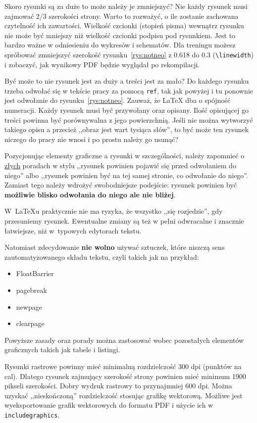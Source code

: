 Skoro rysunki są za duże to może należy je zmniejszyć? Nie każdy rysunek musi zajmować 2/3 szerokości strony. Warto to rozważyć, o ile zostanie zachowana czytelność ich zawartości. Wielkość czcionki (stopień pisma) wewnątrz rysunku nie może być mniejszy niż wielkość czcionki podpisu pod rysunkiem. Jest to bardzo ważne w odniesieniu do wykresów i schematów. Dla treningu możesz spróbować zmniejszyć szerokość rysunku~\ref{rys:notneo} z 0.618 do 0.3 (\texttt{\textbackslash linewidth}) i zobaczyć, jak wynikowy PDF będzie wyglądał po rekompilacji.

Być może to nie rysunek jest za duży a treści jest za mało? Do każdego rysunku trzeba odwołać się w tekście pracy za pomocą \texttt{ref}, tak jak powyżej i tu ponownie jest odwołanie do rysunku~\ref{rys:notneo}. Zauważ, że \LaTeX{} dba o spójność numeracji. Każdy rysunek musi być przywołany oraz opisany. Ilość opisującej go treści powinna być porównywalna z jego powierzchnią. Jeśli nie można wytworzyć takiego opisu a przecież ,,obraz jest wart tysiąca słów'', to być może ten rysunek niczego do pracy nie wnosi i po prostu należy go usunąć?

Pozycjonując elementy graficzne a rysunki w szczególności, należy zapomnieć o \underline{złych} poradach w stylu ,,rysunek powinien pojawić się przed odwołaniem do niego'' albo ,,rysunek powinien być na tej samej stronie, co odwołanie do niego''. Zamiast tego należy wdrożyć swobodniejsze podejście: rysunek powinien być \textbf{możliwie blisko odwołania do niego ale nie bliżej}.

W~\LaTeX{u} praktycznie nie ma ryzyka, że wszystko ,,się rozjedzie'', gdy przesuniemy rysunek. Ewentualne zmiany są też w pełni odwracalne i znacznie łatwiejsze, niż w~typowych edytorach tekstu.

Natomiast zdecydowanie \textbf{nie wolno} używać sztuczek, które niszczą sens zautomatyzowanego składu tekstu, czyli takich jak na przykład:
\begin{itemize}
	\item FloatBarrier
	\item pagebreak
	\item newpage
	\item clearpage
\end{itemize}

Powyższe zasady oraz porady można zastosować wobec pozostałych elementów graficznych takich jak tabele i listingi.

Rysunki rastrowe powinny mieć minimalną rozdzielczość 300 dpi (punktów na cal). Dlatego rysunek zajmujący szerokość strony powinien mieć minimum 1900 pikseli szerokości. Dobry wydruk rastrowy to przynajmniej 600 dpi. Można uzyskać ,,nieskończoną'' rozdzielczość stosując grafikę wektorową. Możliwe jest wyeksportowanie grafik wektorowych do formatu PDF i użycie ich w \texttt{includegraphics}.

